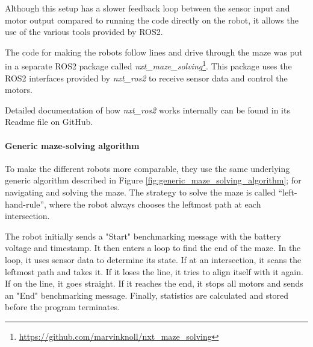 Although this setup has a slower feedback loop between the sensor input and motor output compared to running the code directly on the robot, it allows the use of the various tools provided by ROS2.

The code for making the robots follow lines and drive through the maze was put in a separate ROS2 package called \textit{nxt\_maze\_solving}\footnote{\url{https://github.com/marvinknoll/nxt_maze_solving}}. This package uses the ROS2 interfaces provided by \textit{nxt\_ros2} to receive sensor data and control the motors.

Detailed documentation of how \textit{nxt\_ros2} works internally can be found in its Readme file on GitHub.


\paragraph{Generic maze-solving algorithm}

To make the different robots more comparable, they use the same underlying generic algorithm described in Figure \ref{fig:generic_maze_solving_algorithm}; for navigating and solving the maze. The strategy to solve the maze is called “left-hand-rule”, where the robot always chooses the leftmost path at each intersection.

The robot initially sends a "Start" benchmarking message with the battery voltage and timestamp. It then enters a loop to find the end of the maze. In the loop, it uses sensor data to determine its state. If at an intersection, it scans the leftmost path and takes it. If it loses the line, it tries to align itself with it again. If on the line, it goes straight. If it reaches the end, it stops all motors and sends an "End" benchmarking message. Finally, statistics are calculated and stored before the program terminates.

